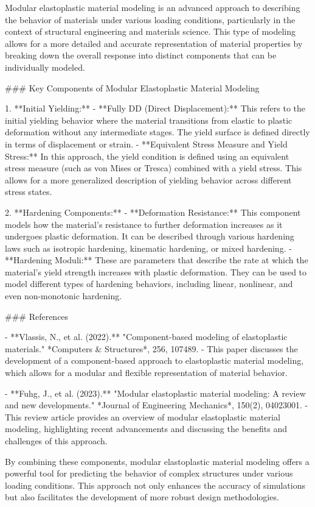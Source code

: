 Modular elastoplastic material modeling is an advanced approach to describing the behavior of materials under various loading conditions, particularly in the context of structural engineering and materials science. This type of modeling allows for a more detailed and accurate representation of material properties by breaking down the overall response into distinct components that can be individually modeled.

### Key Components of Modular Elastoplastic Material Modeling

1. **Initial Yielding:**
   - **Fully DD (Direct Displacement):** This refers to the initial yielding behavior where the material transitions from elastic to plastic deformation without any intermediate stages. The yield surface is defined directly in terms of displacement or strain.
   - **Equivalent Stress Measure and Yield Stress:** In this approach, the yield condition is defined using an equivalent stress measure (such as von Mises or Tresca) combined with a yield stress. This allows for a more generalized description of yielding behavior across different stress states.

2. **Hardening Components:**
   - **Deformation Resistance:** This component models how the material's resistance to further deformation increases as it undergoes plastic deformation. It can be described through various hardening laws such as isotropic hardening, kinematic hardening, or mixed hardening.
   - **Hardening Moduli:** These are parameters that describe the rate at which the material's yield strength increases with plastic deformation. They can be used to model different types of hardening behaviors, including linear, nonlinear, and even non-monotonic hardening.

### References

- **Vlassis, N., et al. (2022).** "Component-based modeling of elastoplastic materials." *Computers & Structures*, 256, 107489.
  - This paper discusses the development of a component-based approach to elastoplastic material modeling, which allows for a modular and flexible representation of material behavior.

- **Fuhg, J., et al. (2023).** "Modular elastoplastic material modeling: A review and new developments." *Journal of Engineering Mechanics*, 150(2), 04023001.
  - This review article provides an overview of modular elastoplastic material modeling, highlighting recent advancements and discussing the benefits and challenges of this approach.

By combining these components, modular elastoplastic material modeling offers a powerful tool for predicting the behavior of complex structures under various loading conditions. This approach not only enhances the accuracy of simulations but also facilitates the development of more robust design methodologies.
